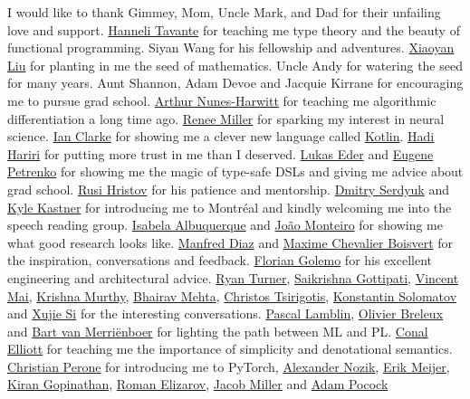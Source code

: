 \vspace{-60pt} I would like to thank Gimmey, Mom, Uncle Mark, and Dad for their unfailing love and support. \href{http://hannelita.com/}{Hanneli Tavante} for teaching me type theory and the beauty of functional programming. Siyan Wang for his fellowship and adventures. \href{https://laverne.edu/directory/person/xiaoyan-liu/}{Xiaoyan Liu} for planting in me the seed of mathematics. Uncle Andy for watering the seed for many years. Aunt Shannon, Adam Devoe and Jacquie Kirrane for encouraging me to pursue grad school. \href{https://www.cs.rit.edu/~anh/}{Arthur Nunes-Harwitt} for teaching me algorithmic differentiation a long time ago. \href{https://www.sas.rochester.edu/bcs/people/faculty/miller_renee/index.html}{Renee Miller} for sparking my interest in neural science. \href{http://blog.locut.us}{Ian Clarke} for showing me a clever new language called \href{https://kotlinlang.org/}{Kotlin}. \href{https://hadihariri.com/}{Hadi Hariri} for putting more trust in me than I deserved. \href{https://www.jooq.org/}{Lukas Eder} and \href{https://jonnyzzz.com/}{Eugene Petrenko} for showing me the magic of type-safe DSLs and giving me advice about grad school. \href{https://github.com/rusi}{Rusi Hristov} for his patience and mentorship. \href{https://scholar.google.ca/citations?user=PsKlNzUAAAAJ}{Dmitry Serdyuk} and \href{http://kastnerkyle.github.io/}{Kyle Kastner} for introducing me to Montr\'eal and kindly welcoming me into the speech reading group. \href{https://scholar.google.ca/citations?user=-Ss9QGkAAAAJ}{Isabela Albuquerque} and \href{https://scholar.google.ca/citations?user=hkO47vsAAAAJ}{Jo\~ao Monteiro} for showing me what good research looks like. \href{https://takeitallsource.github.io}{Manfred Diaz} and \href{https://pointersgonewild.com/}{Maxime Chevalier Boisvert} for the inspiration, conversations and feedback. \href{https://fgolemo.github.io/}{Florian Golemo} for his excellent engineering and architectural advice. \href{http://TurnerComputing.com}{Ryan Turner}, \href{https://saikrishna-1996.github.io}{Saikrishna Gottipati}, \href{https://maivincent.github.io}{Vincent Mai}, \href{https://krrish94.github.io/}{Krishna Murthy}, \href{https://bhairavmehta95.github.io/}{Bhairav Mehta}, \href{https://mila.quebec/en/person/christos-tsirigotis/}{Christos Tsirigotis}, \href{http://www.solomatov.me/}{Konstantin Solomatov} and \href{https://www.seas.upenn.edu/~xsi/}{Xujie Si} for the interesting conversations. \href{https://scholar.google.ca/citations?user=bn4xHHIAAAAJ}{Pascal Lamblin}, \href{http://breuleux.net}{Olivier Breleux} and \href{https://scholar.google.ca/citations?user=XE9SDzgAAAAJ}{Bart van Merri\"enboer} for lighting the path between ML and PL. \href{http://conal.net/}{Conal Elliott} for teaching me the importance of simplicity and denotational semantics. \href{http://christianperone.com}{Christian Perone} for introducing me to PyTorch, \href{https://research.jetbrains.org/researchers/altavir}{Alexander Nozik}, \href{https://twitter.com/headinthebox}{Erik Meijer}, \href{https://scholar.google.com/citations?user=IcuGXgcAAAAJ}{Kiran Gopinathan}, \href{https://medium.com/@elizarov}{Roman Elizarov}, \href{https://cquic.unm.edu/member/jacob.miller/}{Jacob Miller} and \href{http://www.adampocock.com/}{Adam Pocock} 